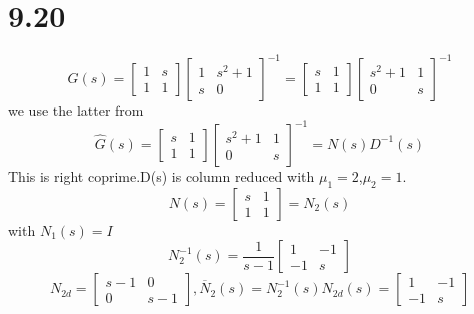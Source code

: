 \documentclass{article}
\begin{document}
\section*{9.20}
\[
G(s)=\left[ 
    \begin{array}{cc}
        1 & s\\
        1 & 1
    \end{array}
\right] \left[ 
    \begin{array}{cc}
        1 & s^2+1\\
        s & 0
    \end{array}
\right]^{-1}=
\left[ 
    \begin{array}{cc}
        s & 1\\
        1 & 1
    \end{array}
\right]\left[ 
    \begin{array}{cc}
        s^2+1 & 1\\
        0 & s
    \end{array}
\right]^{-1}
\]
we use the latter from
\[\hat{G}(s)=
    \left[ 
        \begin{array}{cc}
            s & 1\\
            1 & 1  
        \end{array}
    \right]\left[ 
        \begin{array}{cc}
            s^2+1 & 1\\
            0 & s
        \end{array}
    \right]^{-1}=N(s)D^{-1}(s)
\]
This is right coprime.D(s) is column reduced with $\mu_1=2$,$\mu_2=1$.
\[
N(s)=\left[ 
    \begin{array}{cc}
        s & 1\\
        1 & 1
    \end{array}
\right]=N_2(s)    
\]
with $N_1(s)=I$
\[
N^{-1}_2(s)=\frac{1}{s-1}\left[ 
    \begin{array}{cc}
        1 & -1\\
        -1 & s
    \end{array}
\right]    
\]
\[
    N_{2d}=
    \left[ 
        \begin{array}{cc}
            s-1 & 0\\
            0 & s-1
        \end{array}
    \right]
    ,
    \overline{N}_2(s)=N_2^{-1}(s)N_{2d}(s)=
    \left[ 
        \begin{array}{cc}
            1 & -1\\
            -1 & s
        \end{array}
    \right]   
\]
\end{document}
